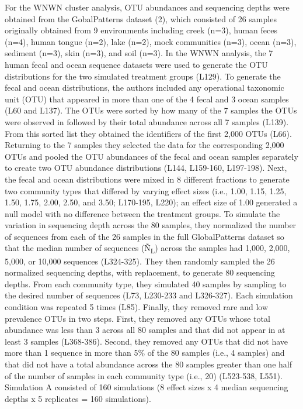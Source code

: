 \documentclass[
]{article}
\begin{document}
For the WNWN cluster analysis, OTU abundances and sequencing depths were
obtained from the GobalPatterns dataset (2), which consisted of 26
samples originally obtained from 9 environments including creek (n=3),
human feces (n=4), human tongue (n=2), lake (n=2), mock communities
(n=3), ocean (n=3), sediment (n=3), skin (n=3), and soil (n=3). In the
WNWN analysis, the 7 human fecal and ocean sequence datasets were used
to generate the OTU distributions for the two simulated treatment groups
(L129). To generate the fecal and ocean distributions, the authors
included any operational taxonomic unit (OTU) that appeared in more than
one of the 4 fecal and 3 ocean samples (L60 and L137). The OTUs were
sorted by how many of the 7 samples the OTUs were observed in followed
by their total abundance across all 7 samples (L139). From this sorted
list they obtained the identifiers of the first 2,000 OTUs (L66).
Returning to the 7 samples they selected the data for the corresponding
2,000 OTUs and pooled the OTU abundances of the fecal and ocean samples
separately to create two OTU abundance distributions (L144, L159-160,
L197-198). Next, the fecal and ocean distributions were mixed in 8
different fractions to generate two community types that differed by
varying effect sizes (i.e., 1.00, 1.15, 1.25, 1.50, 1.75, 2.00, 2.50,
and 3.50; L170-195, L220); an effect size of 1.00 generated a null model
with no difference between the treatment groups. To simulate the
variation in sequencing depth across the 80 samples, they normalized the
number of sequences from each of the 26 samples in the full
GlobalPatterns dataset so that the median number of sequences
(Ñ\textsubscript{L}) across the samples had 1,000, 2,000, 5,000, or
10,000 sequences (L324-325). They then randomly sampled the 26
normalized sequencing depths, with replacement, to generate 80
sequencing depths. From each community type, they simulated 40 samples
by sampling to the desired number of sequences (L73, L230-233 and
L326-327). Each simulation condition was repeated 5 times (L85).
Finally, they removed rare and low prevalence OTUs in two steps. First,
they removed any OTUs whose total abundance was less than 3 across all
80 samples and that did not appear in at least 3 samples (L368-386).
Second, they removed any OTUs that did not have more than 1 sequence in
more than 5\% of the 80 samples (i.e., 4 samples) and that did not have
a total abundance across the 80 samples greater than one half of the
number of samples in each community type (i.e., 20) (L523-538, L551).
Simulation A consisted of 160 simulations (8 effect sizes x 4 median
sequencing depths x 5 replicates = 160 simulations).
\end{document}
